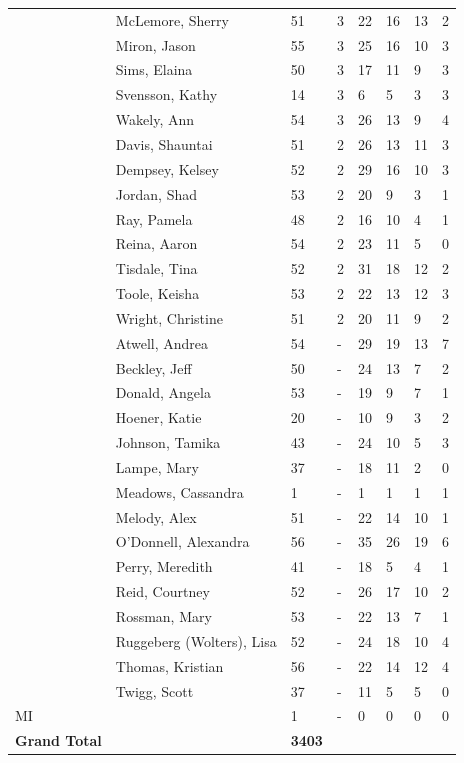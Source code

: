 \documentclass{article}\usepackage[]{graphicx}\usepackage[]{color}
\begin{document}
{\begin{longtable} { >{\raggedright}p{}p{}p{}p{}p{}p{}p{}p{}}
   \rowcolor[gray]{0.90} & McLemore, Sherry & 51 & 3 & 22 & 16 & 13 & 2 \\ 
   \rowcolor[gray]{0.90} & Miron, Jason & 55 & 3 & 25 & 16 & 10 & 3 \\ 
   & Sims, Elaina & 50 & 3 & 17 & 11 & 9 & 3 \\ 
   & Svensson, Kathy & 14 & 3 & 6 & 5 & 3 & 3 \\ 
   & Wakely, Ann & 54 & 3 & 26 & 13 & 9 & 4 \\ 
   \rowcolor[gray]{0.90} & Davis, Shauntai & 51 & 2 & 26 & 13 & 11 & 3 \\ 
   \rowcolor[gray]{0.90} & Dempsey, Kelsey & 52 & 2 & 29 & 16 & 10 & 3 \\ 
   \rowcolor[gray]{0.90} & Jordan, Shad & 53 & 2 & 20 & 9 & 3 & 1 \\ 
   & Ray, Pamela & 48 & 2 & 16 & 10 & 4 & 1 \\ 
   & Reina, Aaron & 54 & 2 & 23 & 11 & 5 & 0 \\ 
   & Tisdale, Tina & 52 & 2 & 31 & 18 & 12 & 2 \\ 
   \rowcolor[gray]{0.90} & Toole, Keisha & 53 & 2 & 22 & 13 & 12 & 3 \\ 
   \rowcolor[gray]{0.90} & Wright, Christine & 51 & 2 & 20 & 11 & 9 & 2 \\ 
   \rowcolor[gray]{0.90} & Atwell, Andrea & 54 & - & 29 & 19 & 13 & 7 \\ 
   & Beckley, Jeff & 50 & - & 24 & 13 & 7 & 2 \\ 
   & Donald, Angela & 53 & - & 19 & 9 & 7 & 1 \\ 
   & Hoener, Katie & 20 & - & 10 & 9 & 3 & 2 \\ 
   \rowcolor[gray]{0.90} & Johnson, Tamika & 43 & - & 24 & 10 & 5 & 3 \\ 
   \rowcolor[gray]{0.90} & Lampe, Mary & 37 & - & 18 & 11 & 2 & 0 \\ 
   \rowcolor[gray]{0.90} & Meadows, Cassandra & 1 & - & 1 & 1 & 1 & 1 \\ 
   & Melody, Alex & 51 & - & 22 & 14 & 10 & 1 \\ 
   & O'Donnell, Alexandra & 56 & - & 35 & 26 & 19 & 6 \\ 
   & Perry, Meredith & 41 & - & 18 & 5 & 4 & 1 \\ 
   \rowcolor[gray]{0.90} & Reid, Courtney & 52 & - & 26 & 17 & 10 & 2 \\ 
   \rowcolor[gray]{0.90} & Rossman, Mary & 53 & - & 22 & 13 & 7 & 1 \\ 
   \rowcolor[gray]{0.90} & Ruggeberg (Wolters), Lisa & 52 & - & 24 & 18 & 10 & 4 \\ 
   & Thomas, Kristian & 56 & - & 22 & 14 & 12 & 4 \\ 
   & Twigg, Scott & 37 & - & 11 & 5 & 5 & 0 \\ 
   \hline
MI &  & 1 & - & 0 & 0 & 0 & 0 \\ 
   \hline
\hline
\textbf{Grand Total} &  & \textbf{ 3403 } &  & {\textbf{1473} & {\textbf{845} & {\textbf{533} & {\textbf{150} \\ 
   \end{longtable}

}
\end{document}
